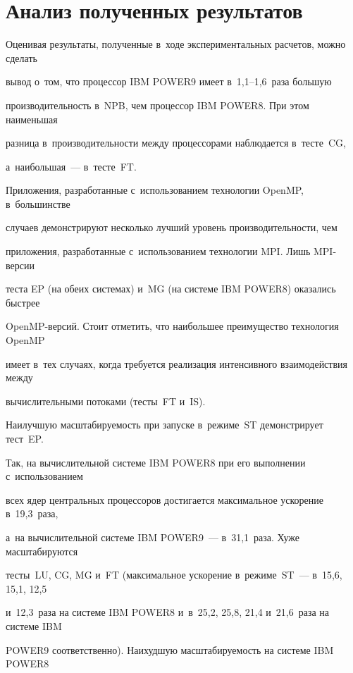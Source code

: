 \section{Анализ полученных результатов} %





Оценивая результаты, полученные в~ходе экспериментальных расчетов, можно сделать 


вывод о~том, что процессор IBM POWER9 имеет в~1,1--1,6~раза большую 


производительность в~NPB, чем процессор IBM \mbox{POWER8}. При этом наименьшая 


разница в~производительности между процессорами наблюдается в~тесте~CG, 


а~наибольшая~--- в~тесте~FT.





Приложения, разработанные с~использованием технологии OpenMP, в~большинстве 


случаев демонстрируют несколько лучший уровень производительности, чем 


приложения, разработанные с~использованием технологии MPI. Лишь MPI-вер\-сии 


теста EP (на обеих системах) и~MG (на системе IBM POWER8) оказались быстрее 


\mbox{OpenMP}-вер\-сий. Стоит отметить, что наибольшее преимущество технология \mbox{OpenMP} 


имеет в~тех случаях, когда требуется реализация интенсивного взаимодействия между 


вычислительными потоками (тесты~FT и~IS).





Наилучшую масштабируемость при запуске в~режиме~ST демонстрирует тест~EP. 


Так, на вычислительной системе IBM \mbox{POWER8} при его выполнении с~использованием 


всех ядер центральных процессоров достигается максимальное ускорение в~19,3~раза, 


а~на вычислительной системе IBM \mbox{POWER9}~--- в~31,1~раза. Хуже масштабируются 


тесты~LU, CG, MG и~FT (максимальное ускорение в~режиме~ST~--- в~15,6, 15,1, 12,5 


и~12,3~раза на системе IBM POWER8 и~в~25,2, 25,8, 21,4 и~21,6~раза на системе IBM 


POWER9 соответственно). Наихудшую масштабируемость на системе IBM \mbox{POWER8} 



